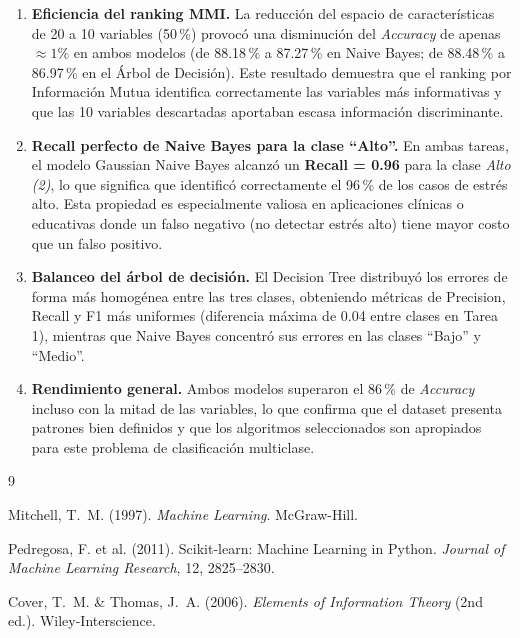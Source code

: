 \documentclass[12pt, letterpaper]{article}
\begin{document}
\begin{enumerate}

    \item \textbf{Eficiencia del ranking MMI.}
    La reducción del espacio de características de 20 a 10 variables
    (50\,\%) provocó una disminución del \textit{Accuracy} de apenas
    $\approx\!1\%$ en ambos modelos (de 88.18\,\% a 87.27\,\% en
    Naive Bayes; de 88.48\,\% a 86.97\,\% en el Árbol de Decisión).
    Este resultado demuestra que el ranking por Información Mutua identifica
    correctamente las variables más informativas y que las 10 variables
    descartadas aportaban escasa información discriminante.

    \item \textbf{Recall perfecto de Naive Bayes para la clase ``Alto''.}
    En ambas tareas, el modelo Gaussian Naive Bayes alcanzó un
    \textbf{Recall = 0.96} para la clase \textit{Alto (2)}, lo que significa
    que identificó correctamente el 96\,\% de los casos de estrés alto.
    Esta propiedad es especialmente valiosa en aplicaciones clínicas o
    educativas donde un falso negativo (no detectar estrés alto) tiene mayor
    costo que un falso positivo.

    \item \textbf{Balanceo del árbol de decisión.}
    El Decision Tree distribuyó los errores de forma más homogénea entre las
    tres clases, obteniendo métricas de Precision, Recall y F1 más uniformes
    (diferencia máxima de 0.04 entre clases en Tarea 1), mientras que
    Naive Bayes concentró sus errores en las clases ``Bajo'' y ``Medio''.

    \item \textbf{Rendimiento general.}
    Ambos modelos superaron el 86\,\% de \textit{Accuracy} incluso con la
    mitad de las variables, lo que confirma que el dataset presenta patrones
    bien definidos y que los algoritmos seleccionados son apropiados para
    este problema de clasificación multiclase.

\end{enumerate}

\newpage
\begin{thebibliography}{9}

    Mitchell, T.~M. (1997).
    \textit{Machine Learning}.
    McGraw-Hill.

    Pedregosa, F. et al. (2011).
    Scikit-learn: Machine Learning in Python.
    \textit{Journal of Machine Learning Research}, 12, 2825--2830.

    Cover, T.~M. \& Thomas, J.~A. (2006).
    \textit{Elements of Information Theory} (2nd ed.).
    Wiley-Interscience.

\end{thebibliography}
\end{document}
